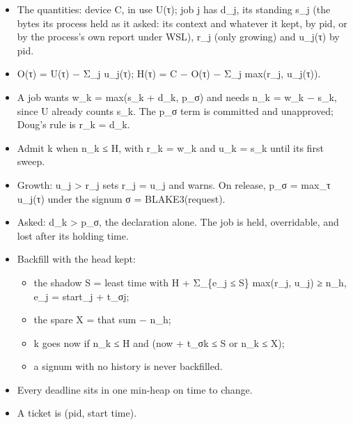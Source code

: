 \begin{itemize}
\item The quantities: device C, in use U(τ); job j has d\_\allowbreak{}j, its standing s\_\allowbreak{}j (the bytes its process held as it asked: its context and whatever it kept, by pid, or by the process's own report under WSL), r\_\allowbreak{}j (only growing) and u\_\allowbreak{}j(τ) by pid.
\item O(τ) = U(τ) − Σ\_\allowbreak{}j u\_\allowbreak{}j(τ); H(τ) = C − O(τ) − Σ\_\allowbreak{}j max(r\_\allowbreak{}j, u\_\allowbreak{}j(τ)).
\item A job wants w\_\allowbreak{}k = max(s\_\allowbreak{}k + d\_\allowbreak{}k, p\_\allowbreak{}σ) and needs n\_\allowbreak{}k = w\_\allowbreak{}k − s\_\allowbreak{}k, since U already counts s\_\allowbreak{}k. The p\_\allowbreak{}σ term is committed and unapproved; Doug's rule is r\_\allowbreak{}k = d\_\allowbreak{}k.
\item Admit k when n\_\allowbreak{}k ≤ H, with r\_\allowbreak{}k = w\_\allowbreak{}k and u\_\allowbreak{}k = s\_\allowbreak{}k until its first sweep.
\item Growth: u\_\allowbreak{}j > r\_\allowbreak{}j sets r\_\allowbreak{}j = u\_\allowbreak{}j and warns. On release, p\_\allowbreak{}σ = max\_\allowbreak{}τ u\_\allowbreak{}j(τ) under the signum σ = BLAKE3(request).
\item Asked: d\_\allowbreak{}k > p\_\allowbreak{}σ, the declaration alone. The job is held, overridable, and lost after its holding time.
\item Backfill with the head kept:

\begin{itemize}
\item the shadow S = least time with H + Σ\_\allowbreak{}\{e\_\allowbreak{}j ≤ S\} max(r\_\allowbreak{}j, u\_\allowbreak{}j) ≥ n\_\allowbreak{}h, e\_\allowbreak{}j = start\_\allowbreak{}j + t\_\allowbreak{}σj;
\item the spare X = that sum − n\_\allowbreak{}h;
\item k goes now if n\_\allowbreak{}k ≤ H and (now + t\_\allowbreak{}σk ≤ S or n\_\allowbreak{}k ≤ X);
\item a signum with no history is never backfilled.
\end{itemize}
\item Every deadline sits in one min-heap on time to change.
\item A ticket is (pid, start time).
\end{itemize}

